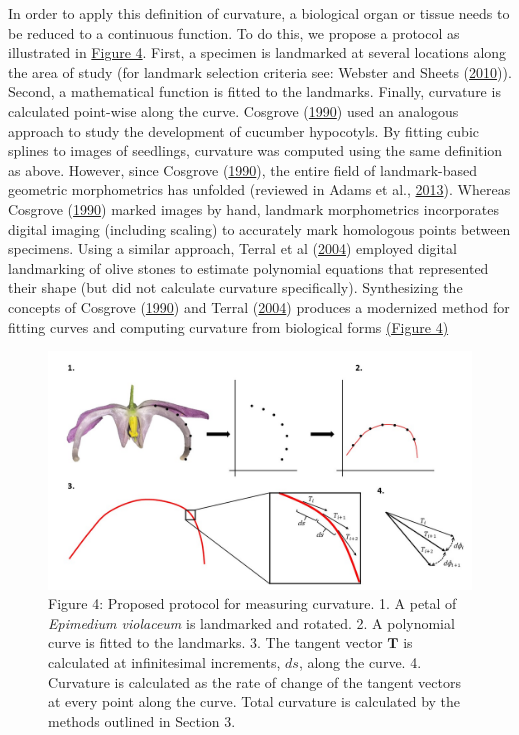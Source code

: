 \documentclass[]{article}
\begin{document}
In order to apply this definition of curvature, a biological organ or
tissue needs to be reduced to a continuous function. To do this, we
propose a protocol as illustrated in \href{Figures/Figure_4.jpg}{Figure
4}. First, a specimen is landmarked at several locations along the area
of study (for landmark selection criteria see: Webster and Sheets
(\protect\hyperlink{ref-webster_2010}{2010})). Second, a mathematical
function is fitted to the landmarks. Finally, curvature is calculated
point-wise along the curve. Cosgrove
(\protect\hyperlink{ref-cosgrove_1990}{1990}) used an analogous approach
to study the development of cucumber hypocotyls. By fitting cubic
splines to images of seedlings, curvature was computed using the same
definition as above. However, since Cosgrove
(\protect\hyperlink{ref-cosgrove_1990}{1990}), the entire field of
landmark-based geometric morphometrics has unfolded (reviewed in Adams
et al., \protect\hyperlink{ref-adams_2013}{2013}). Whereas Cosgrove
(\protect\hyperlink{ref-cosgrove_1990}{1990}) marked images by hand,
landmark morphometrics incorporates digital imaging (including scaling)
to accurately mark homologous points between specimens. Using a similar
approach, Terral et al (\protect\hyperlink{ref-terral_2004}{2004})
employed digital landmarking of olive stones to estimate polynomial
equations that represented their shape (but did not calculate curvature
specifically). Synthesizing the concepts of Cosgrove
(\protect\hyperlink{ref-cosgrove_1990}{1990}) and Terral
(\protect\hyperlink{ref-terral_2004}{2004}) produces a modernized method
for fitting curves and computing curvature from biological forms
\href{Figures/Figure_4.jpg}{(Figure 4)}

\begin{figure}
\centering
\includegraphics{Figures/Figure_4.jpg}
\caption{Figure 4: Proposed protocol for measuring curvature. 1. A petal
of \emph{Epimedium violaceum} is landmarked and rotated. 2. A polynomial
curve is fitted to the landmarks. 3. The tangent vector \(\mathbf{T}\)
is calculated at infinitesimal increments, \(ds\), along the curve. 4.
Curvature is calculated as the rate of change of the tangent vectors at
every point along the curve. Total curvature is calculated by the
methods outlined in Section 3.}
\end{figure}
\end{document}
